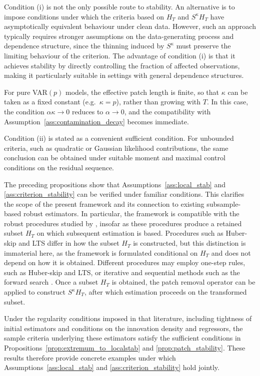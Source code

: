 \documentclass[12pt]{article}
\numberwithin{equation}{section}
\begin{document}
Condition (i) is not the only possible route to stability. 
An alternative is to impose conditions under which the criteria based on $H_T$ and $S^\kappa H_T$ have asymptotically equivalent behaviour under clean data. 
However, such an approach typically requires stronger assumptions on the data-generating process and dependence structure, since the thinning induced by $S^\kappa$ must preserve the limiting behaviour of the criterion. 
The advantage of condition (i) is that it achieves stability by directly controlling the fraction of affected observations, making it particularly suitable in settings with general dependence structures.

For pure VAR$(p)$ models, the effective patch length is finite, so that $\kappa$ can be taken as a fixed constant (e.g.\ $\kappa=p$), rather than growing with $T$. 
In this case, the condition $\alpha \kappa \to 0$ reduces to $\alpha \to 0$, and the compatibility with Assumption~\ref{ass:contamination_decay} becomes immediate.

Condition (ii) is stated as a convenient sufficient condition. 
For unbounded criteria, such as quadratic or Gaussian likelihood contributions, the same conclusion can be obtained under suitable moment and maximal control conditions on the residual sequence.

The preceding propositions show that Assumptions~\ref{ass:local_stab} and \ref{ass:criterion_stability} can be verified under familiar conditions. 
This clarifies the scope of the present framework and its connection to existing subsample-based robust estimators. 
In particular, the framework is compatible with the robust procedures studied by \citet{JohansenNielsen2009,JohansenNielsen2013,JohansenNielsen2016}, insofar as these procedures produce a retained subset $H_T$ on which subsequent estimation is based. 
Procedures such as Huber-skip and LTS differ in how the subset $H_T$ is constructed, but this distinction is immaterial here, as the framework is formulated conditional on $H_T$ and does not depend on how it is obtained. 
Different procedures may employ one-step rules, such as Huber-skip and LTS, or iterative and sequential methods such as the forward search \citep{HadiSimonoff1993, AtkinsonRiani2000}. 
Once a subset $H_T$ is obtained, the patch removal operator can be applied to construct $S^\kappa H_T$, after which estimation proceeds on the transformed subset.

Under the regularity conditions imposed in that literature, including tightness of initial estimators and conditions on the innovation density and regressors, the sample criteria underlying these estimators satisfy the sufficient conditions in Propositions~\ref{prop:extremum_to_localstab} and \ref{prop:patch_stability}. 
These results therefore provide concrete examples under which Assumptions~\ref{ass:local_stab} and \ref{ass:criterion_stability} hold jointly.
\end{document}
